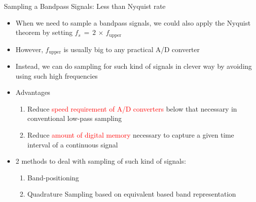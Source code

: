 \begin{frame}[t]{Sampling a Bandpass Signals: Less than Nyquist rate}

\begin{itemize}

\item When we need to sample a bandpass signals, we could also apply the Nyquist theorem by setting $f_s \, = \, 2 \, \times \, f_{\text{upper}}$

\item However, $f_{\text{upper}}$ is usually big to any practical A/D converter

\item Instead, we can do sampling for such kind of signals in clever way by avoiding using such high frequencies


\item Advantages \cite{book_understanding_dsp}

	\begin{enumerate}
	\item Reduce \textcolor{red}{speed requirement of A/D converters} below that necessary in conventional low-pass sampling
	
	\item Reduce \textcolor{red}{amount of digital memory }necessary to capture a given time interval of a continuous signal
	\end{enumerate}


\item 2 methods to deal with sampling of such kind of signals:


	\begin{enumerate}
	\item Band-positioning
	
	\item Quadrature Sampling based on equivalent based band representation
	
	\end{enumerate}


\end{itemize}

\end{frame}


